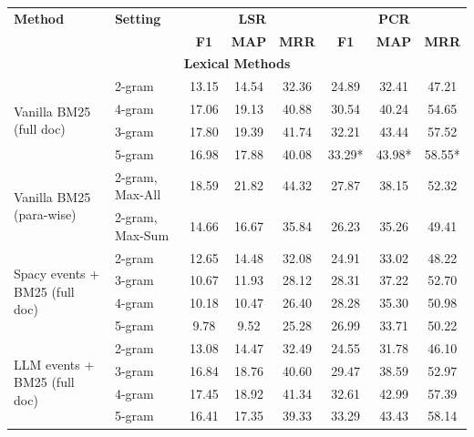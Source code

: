 \begin{table}[!thb]
    \centering
    \small
    \begin{tabular}{p{}p{}cccccc}
         \toprule
         \textbf{Method} & \textbf{Setting} & \multicolumn{3}{c}{\textbf{LSR}} & \multicolumn{3}{c}{\textbf{PCR}} \\
          & & \textbf{F1} & \textbf{MAP} & \textbf{MRR} & \textbf{F1} & \textbf{MAP} & \textbf{MRR} \\ \midrule 
        \multicolumn{8}{c}{\textbf{Lexical Methods}}\\ \midrule 
 
         \multirow{4}{0.24\textwidth}{Vanilla BM25 (full doc)} & 2-gram & 13.15& 14.54& 32.36& 24.89& 32.41& 47.21\\
          & 4-gram & 17.06& 19.13& 40.88& 30.54& 40.24& 54.65\\ 
          & 3-gram & 17.80& 19.39& 41.74& 32.21& 43.44& 57.52\\ 
          & 5-gram & 16.98& 17.88& 40.08& 33.29* & 43.98* & 58.55*\\ \midrule 

        \multirow{2}{0.24\textwidth}{Vanilla BM25 (para-wise)} & 2-gram, Max-All & 18.59& 21.82& 44.32& 27.87& 38.15& 52.32\\
        & 2-gram, Max-Sum & 14.66& 16.67& 35.84& 26.23& 35.26& 49.41\\ \midrule 
        

        
         \multirow{4}{0.24\textwidth}{Spacy events + BM25 (full doc)} & 2-gram & 12.65 & 14.48 & 32.08 & 24.91 & 33.02  & 48.22 \\
         & 3-gram & 10.67 & 11.93 & 28.12 & 28.31 & 37.22 & 52.70 \\
         & 4-gram & 10.18 & 10.47 & 26.40 & 28.28 & 35.30 & 50.98 \\
         & 5-gram & 9.78 & 9.52 & 25.28 & 26.99 & 33.71 & 50.22 \\ \midrule 
         
         \multirow{4}{0.24\textwidth}{LLM events + BM25 (full doc)} & 2-gram & 13.08& 14.47& 32.49& 24.55& 31.78& 46.10\\
         & 3-gram & 16.84& 18.76& 40.60& 29.47& 38.59& 52.97\\
         & 4-gram & 17.45& 18.92& 41.34& 32.61& 42.99& 57.39\\
         & 5-gram & 16.41& 17.35& 39.33& 33.29& 43.43& 58.14\\ \midrule 
         



\end{tabular}
\end{table}

